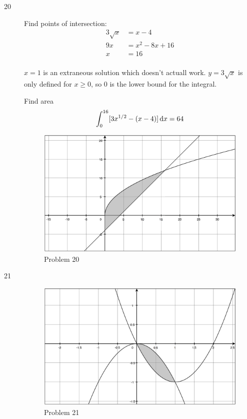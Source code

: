 \documentclass{exam}
\begin{document}
\begin{description}
\item[20]
Find points of intersection:
\begin{align*}
  3 \sqrt{x} &= x - 4 \\
  9x &= x^2 - 8x + 16 \\
  x &= 16 \\
\end{align*}

$x = 1$ is an extraneous solution which doesn't actuall work.  $y = 3\sqrt{x}$ is only defined for $x \geq 0$, so 0 is the lower bound for the integral.

Find area
\[
  \int_0^{16} [ 3x^{1/2} - (x - 4)] \, \mathrm{d}x = 64 \\
\] 

\begin{figure}[H]
  \centering
  \includegraphics[scale=.3]{problem_20.eps}
  \caption*{Problem 20}
\end{figure}

\item[21]
\begin{figure}[H]
  \centering
  \includegraphics[scale=.3]{problem_21.eps}
  \caption*{Problem 21}
\end{figure}


\end{description}
\end{document}
